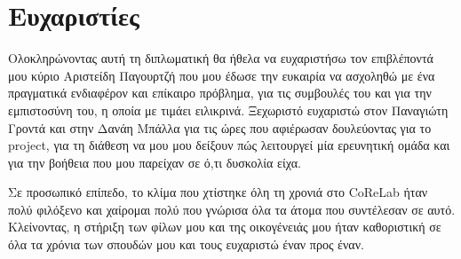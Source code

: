 \newpage
\chapter*{Ευχαριστίες}

Ολοκληρώνοντας αυτή τη διπλωματική θα ήθελα να ευχαριστήσω τον επιβλέποντά μου κύριο Αριστείδη Παγουρτζή που μου έδωσε την ευκαιρία να ασχοληθώ με ένα πραγματικά ενδιαφέρον και επίκαιρο πρόβλημα, για τις συμβουλές του και για την εμπιστοσύνη του, η οποία με τιμάει ειλικρινά. Ξεχωριστό ευχαριστώ στον Παναγιώτη Γροντά και στην Δανάη Μπάλλα για τις ώρες που αφιέρωσαν δουλεύοντας για το project, για τη διάθεση να μου μου δείξουν πώς λειτουργεί μία ερευνητική ομάδα και για την βοήθεια που μου παρείχαν σε ό,τι δυσκολία είχα. 

Σε προσωπικό επίπεδο, το κλίμα που χτίστηκε όλη τη χρονιά στο CoReLab ήταν πολύ φιλόξενο και χαίρομαι πολύ που γνώρισα όλα τα άτομα που συντέλεσαν σε αυτό. Κλείνοντας, η στήριξη των φίλων μου και της οικογένειάς μου ήταν καθοριστική σε όλα τα χρόνια των σπουδών μου και τους ευχαριστώ έναν προς έναν.